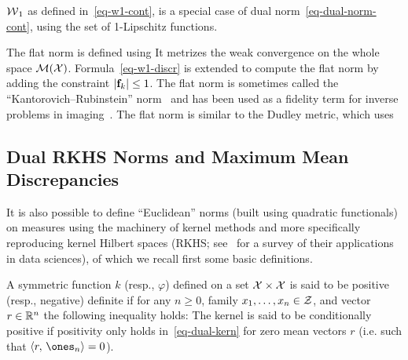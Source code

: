 \begin{example}
$\operatorname{\mathcal{W}}_1$ as defined in~\eqref{eq-w1-cont}, is a special case of dual norm~\eqref{eq-dual-norm-cont}, using
the set of 1-Lipschitz functions.
\end{example}

\begin{example}
The flat norm is defined using 
It metrizes the weak convergence on the whole space $\mathcal{M}(\mathcal{X})$.
% 
Formula~\eqref{eq-w1-discr} is extended to compute the flat norm by adding the constraint $\left\lvert\mathrm{\textbf{f}}_k\right\rvert \leq 1$.
%
The flat norm is sometimes called the ``Kantorovich--Rubinstein'' norm~\citep{hanin1992kantorovich} and has been used as a fidelity term for inverse problems in imaging~\citep{lellmann2014imaging}.
%
The flat norm is  similar to the Dudley metric, which uses
\end{example}


\subsection{Dual RKHS Norms and Maximum Mean Discrepancies}
\label{sec-mmd}


It is also possible to define ``Euclidean'' norms (built using quadratic functionals) on measures using the machinery of kernel methods and more specifically reproducing kernel Hilbert spaces (RKHS; see~\citep{scholkopf2002learning} for a survey of their applications in data sciences), of which we recall first some basic definitions.

\begin{defn}\label{def-negativedefinitekernel}
A symmetric function $k$ (resp., $\varphi$) defined on a set $\mathcal{X} \times \mathcal{X}$ is said to be positive (resp., negative) definite if for any $n\geq0$, family $x_1,\dots,x_n\in\mathcal{Z}$, and vector $r\in\mathbb{R}^n$ the following inequality holds:
The kernel is said to be conditionally positive if positivity only holds in~\eqref{eq-dual-kern} for zero mean vectors $r$ (i.e. such that $\dotp{r}{\ones_n}=0$).  
\end{defn}


